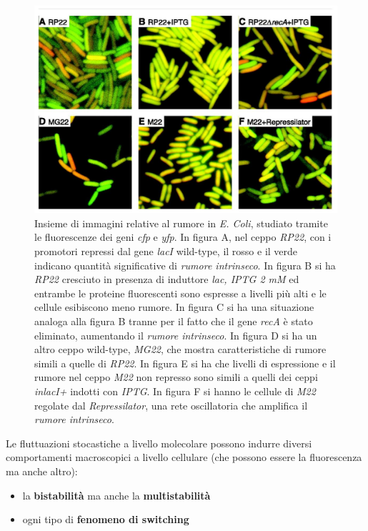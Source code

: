 \documentclass[a4paper,12pt, oneside]{book}
\begin{document}
\begin{figure}
  \centering
  \includegraphics[scale = 0.25]{img/noise2.jpg}
  \caption{Insieme di immagini relative al rumore in \textit{E. Coli}, studiato
    tramite le fluorescenze dei geni \textit{cfp} e \textit{yfp}. In figura A,
    nel ceppo \textit{RP22}, con i promotori repressi dal 
    gene \textit{lacI} wild-type, il rosso e il verde indicano quantità
    significative di \textit{rumore intrinseco}. In figura B si ha \textit{RP22}
    cresciuto in presenza di induttore \textit{lac, IPTG 2 mM} ed entrambe le
    proteine fluorescenti sono espresse a livelli più alti e le cellule
    esibiscono meno rumore. In figura C si ha una situazione analoga alla figura
    B tranne per il fatto che il gene \textit{recA} è stato eliminato,
    aumentando il \textit{rumore intrinseco}. In figura D si ha un altro ceppo
    wild-type, \textit{MG22}, che mostra caratteristiche di rumore simili a
    quelle di \textit{RP22}. In figura E si ha che livelli di espressione e il
    rumore nel ceppo \textit{M22} non represso sono simili a quelli dei ceppi
    \textit{inlacI+} indotti con \textit{IPTG}. In figura F si hanno le cellule
    di \textit{M22} regolate dal \textit{Repressilator}, una rete oscillatoria
    che amplifica il \textit{rumore intrinseco}.}   
  \label{fig:noise}
\end{figure}
Le fluttuazioni stocastiche a livello molecolare possono indurre diversi
comportamenti macroscopici a livello cellulare (che possono essere la
fluorescenza ma anche altro):
\begin{itemize}
  \item la \textbf{bistabilità} ma anche la \textbf{multistabilità}
  \item ogni tipo di \textbf{fenomeno di switching}
\end{itemize}
\end{document}

